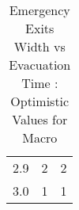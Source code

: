 \begin{table}[H]
{\begin{tabular}{|l|l|l|}
2.9                      & 2                                                                                                                   & 2                                                                                                                  \\
3.0                      & 1                                                                                                                   & 1                                                                                                                  \\
\hline
\end{tabular}}
\caption{Emergency Exits Width vs Evacuation Time : Optimistic Values for Macro}
\label{Emergency Exits Width vs Evacuation Time : Optimistic Values for Macro}
\end{table}

